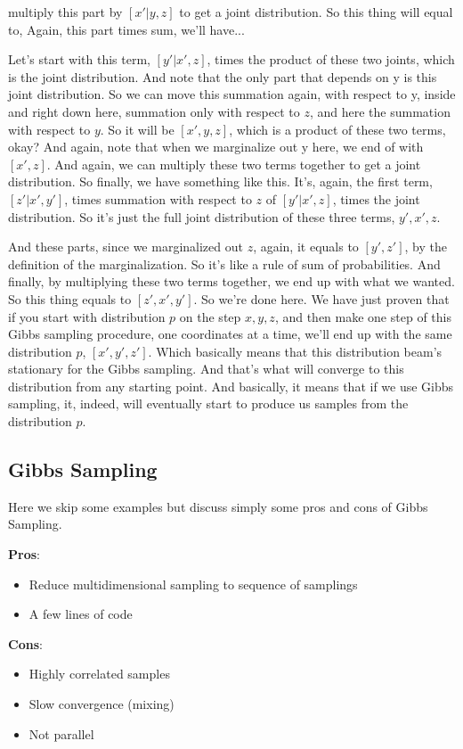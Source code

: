 \documentclass[11pt, oneside, reqno]{amsart}
\numberwithin{equation}{section}
\theoremstyle{plain}%
\theoremstyle{definition}
\theoremstyle{remark}
\begin{document}
multiply this part by $[x'|y,z]$ to get a joint distribution. So this thing will equal to, Again, this part times sum, we'll have...

Let's start with this term, $[y'|x',z]$, times the product of these two joints, which is the joint distribution. And note that the only part that depends on y is this joint distribution. So we can move this summation again, with respect to y, inside and right down here, summation only with respect to $z$, and here the summation with respect to $y$. So it will be $[x', y, z]$, which is a product of these two terms, okay? And again, note that when we marginalize out y here, we end of with $[x', z]$. And again, we can multiply these two terms together to get a joint distribution. So finally, we have something like this. It's, again, the first term, $[z'|x',y']$, times summation with respect to $z$ of $[y'|x', z]$, times the joint distribution. So it's just the full joint distribution of these three terms, $y', x', z$.

And these parts, since we marginalized out $z$, again, it equals to $[y', z']$, by the definition of the marginalization. So it's like a rule of sum of probabilities. And finally, by multiplying these two terms together, we end up with what we wanted. So this thing equals to $[z',x',y']$. So we're done here. We have just proven that if you start with distribution $p$ on the step $x, y, z$, and then make one step of this Gibbs sampling procedure, one coordinates at a time, we'll end up with the same distribution $p$, $[x', y', z']$. Which basically means that this distribution beam's stationary for the Gibbs sampling. And that's what will converge to this distribution from any starting point. And basically, it means that if we use Gibbs sampling, it, indeed, will eventually start to produce us samples from the distribution $p$.
\subsection{Gibbs Sampling}
Here we skip some examples but discuss simply some pros and cons of Gibbs Sampling.


\textbf{Pros}:
\begin{itemize}
	\item Reduce multidimensional sampling to sequence of samplings
	\item A few lines of code
\end{itemize}

\textbf{Cons}:
\begin{itemize}
	\item Highly correlated samples
	\item Slow convergence (mixing)
	\item Not parallel
\end{itemize}
\end{document}
